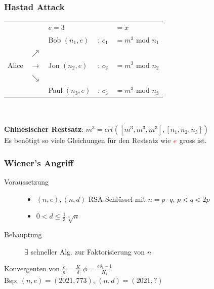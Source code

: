 \documentclass[10pt]{article}
\newcommand{\Oneover}[1]{\frac{1}{#1}} %
\begin{document}
\subsubsection{Hastad Attack}
\begin{tabular}{l l l l l}
    & & {\color{red} $e=3$} & & $=x$ \\
	&  & Bob $(n_1,e)$ & : {\color{red}$c_1$} & $= m^3$ mod $n_1$\\
	&$\nearrow$  \\
	Alice & $\rightarrow$ & Jon $(n_2,e)$ & : {\color{red}$c_2$} & $= m^3$ mod $n_2$\\
	& $\searrow$ \\
	& & Paul $(n_3,e)$ & : {\color{red}$c_3$} & $= m^3$ mod $n_3$
\end{tabular} \\ \\
\textbf{Chinesischer Restsatz}: $m^3= crt([m^3,m^3,m^3],[n_1,n_2,n_3])$ \\
Es benötigt so viele Gleichungen für den Restsatz wie ${\color{red}e}$ gross ist.

\subsubsection{Wiener's Angriff}
\begin{description}
 \item [Voraussetzung] \hfill
    \begin{itemize}
      \item $(n,e),(n,d)$ RSA-Schlüssel mit $n=p\cdot q$, $p<q<2p$
      \item $0<d\leqslant\Oneover{3}\sqrt[4]{n}$
    \end{itemize}
 \item [Behauptung] $\exists$ schneller Alg. zur Faktorisierung von $n$
\end{description}
Konvergenten von $\frac{e}{n} = \frac{K}{\delta}$ $\phi = \frac{e \delta_{i}-1}{K_i}$\\
Bsp: $(n,e) = (2021, 773)$, $(n,d) = (2021, ?)$\\
\end{document}
